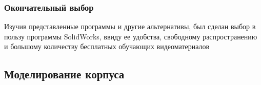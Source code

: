 \subsubsection{Окончательный выбор}
Изучив представленные программы и другие альтернативы, был сделан выбор в пользу программы SolidWorks, ввиду ее удобства, свободному распространению и большому количеству бесплатных обучающих видеоматериалов

\subsection{Моделирование корпуса}